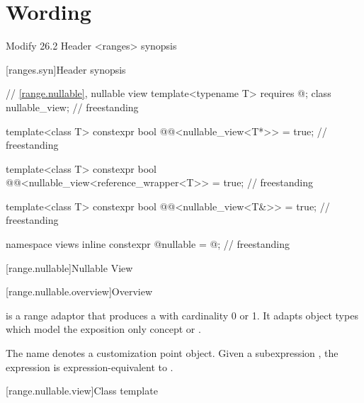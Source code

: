 \documentclass[a4paper,10pt,oneside,openany,final,article]{memoir}
\begin{document}
\chapter{Wording}


\begin{wording}


Modify 26.2 Header <ranges> synopsis

[ranges.syn]{Header  synopsis}

\begin{adjustwidth}{1cm}{1cm}
  \begin{addedblock}
    \begin{codeblock}
// \ref{range.nullable}, nullable view
template<typename T>
requires @\seebelow@;
class nullable_view;                                       // freestanding

template<class T>
constexpr bool
@@<nullable_view<T*>> = true;  // freestanding

template<class T>
constexpr bool
@@<nullable_view<reference_wrapper<T>> = true;  // freestanding

template<class T>
constexpr bool
@@<nullable_view<T&>> = true;  // freestanding

namespace views {
  inline constexpr @\unspec@ nullable = @\unspec@;          // freestanding
}



    \end{codeblock}
  \end{addedblock}
\end{adjustwidth}


[range.nullable]{Nullable View}

[range.nullable.overview]{Overview}

\pnum
{} is a range adaptor that produces a  with cardinality 0 or 1. It adapts object types which model the exposition only concept  or .


\pnum
{}%
The name  denotes a
customization point object.
Given a subexpression , the expression
 is expression-equivalent to
.

[range.nullable.view]{Class template }


\end{wording}
\end{document}
